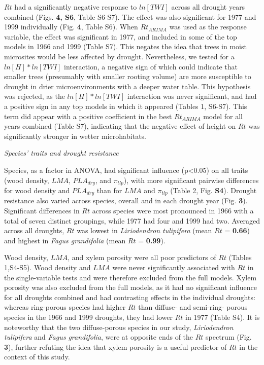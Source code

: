 \documentclass[
]{article}
\begin{document}
\(Rt\) had a significantly negative response to \(ln[TWI]\) across all
drought years combined (Figs. \textbf{4, S6}, Table S6-S7). The effect
was also significant for 1977 and 1999 individually (Fig. \textbf{4},
Table S6). When \(Rt_{ARIMA}\) was used as the response variable, the
effect was significant in 1977, and included in some of the top models
in 1966 and 1999 (Table S7). This negates the idea that trees in moist
microsites would be less affected by drought. Nevertheless, we tested
for a \(ln[H] *ln[TWI]\) interaction, a negative sign of which could
indicate that smaller trees (presumably with smaller rooting volume) are
more susceptible to drought in drier microenvironments with a deeper
water table. This hypothesis was rejected, as the \(ln[H] *ln[TWI]\)
interaction was never significant, and had a positive sign in any top
models in which it appeared (Tables 1, S6-S7). This term did appear with
a positive coefficient in the best \(Rt_{ARIMA}\) model for all years
combined (Table S7), indicating that the negative effect of height on
\(Rt\) was significantly stronger in wetter microhabitats.

\emph{Species' traits and drought resistance}

Species, as a factor in ANOVA, had significant influence
(p\textless0.05) on all traits (wood density, \(LMA\), \(PLA_{dry}\),
and \(\pi_{tlp}\)), with more significant pairwise differences for wood
density and \(PLA_{dry}\) than for \(LMA\) and \(\pi_{tlp}\) (Table 2,
Fig. \textbf{S4}). Drought resistance also varied across species,
overall and in each drought year (Fig. \textbf{3}). Significant
differences in \(Rt\) across species were most pronounced in 1966 with a
total of seven distinct groupings, while 1977 had four and 1999 had two.
Averaged across all droughts, \(Rt\) was lowest in \emph{Liriodendron
tulipifera} (mean \(Rt\) = \textbf{0.66}) and highest in \emph{Fagus
grandifolia} (mean \(Rt\) = \textbf{0.99}).

Wood density, \(LMA\), and xylem porosity were all poor predictors of
\(Rt\) (Tables 1,S4-S5). Wood density and \(LMA\) were never
significantly associated with \(Rt\) in the single-variable tests and
were therefore excluded from the full models. Xylem porosity was also
excluded from the full models, as it had no significant influence for
all droughts combined and had contrasting effects in the individual
droughts: whereas ring-porous species had higher \(Rt\) than diffuse-
and semi-ring- porous species in the 1966 and 1999 droughts, they had
lower \(Rt\) in 1977 (Table S4). It is noteworthy that the two
diffuse-porous species in our study, \emph{Liriodendron tulipifera} and
\emph{Fagus grandifolia}, were at opposite ends of the \(Rt\) spectrum
(Fig. \textbf{3}), further refuting the idea that xylem porosity is a
useful predictor of \(Rt\) in the context of this study.
\end{document}
